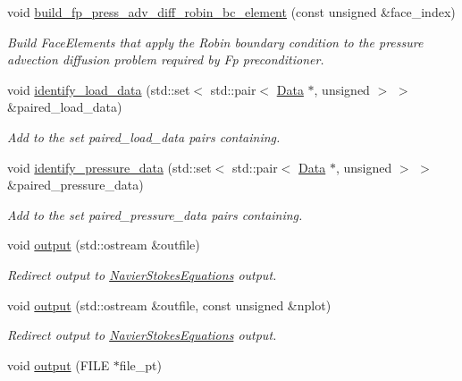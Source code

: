 \begin{DoxyCompactItemize}
void \hyperlink{classoomph_1_1QCrouzeixRaviartElement_a5b824083683ead3f8bead4061bce21f1}{build\+\_\+fp\+\_\+press\+\_\+adv\+\_\+diff\+\_\+robin\+\_\+bc\+\_\+element} (const unsigned \&face\+\_\+index)
\begin{DoxyCompactList}\small\item\em Build Face\+Elements that apply the Robin boundary condition to the pressure advection diffusion problem required by Fp preconditioner. \end{DoxyCompactList}\item 
void \hyperlink{classoomph_1_1QCrouzeixRaviartElement_ae57ed7defb77ccaa537a5d9caae68172}{identify\+\_\+load\+\_\+data} (std\+::set$<$ std\+::pair$<$ \hyperlink{classoomph_1_1Data}{Data} $\ast$, unsigned $>$ $>$ \&paired\+\_\+load\+\_\+data)
\begin{DoxyCompactList}\small\item\em Add to the set {\ttfamily paired\+\_\+load\+\_\+data} pairs containing. \end{DoxyCompactList}\item 
void \hyperlink{classoomph_1_1QCrouzeixRaviartElement_ad01a1d2af20703dfb57971bfba4d376e}{identify\+\_\+pressure\+\_\+data} (std\+::set$<$ std\+::pair$<$ \hyperlink{classoomph_1_1Data}{Data} $\ast$, unsigned $>$ $>$ \&paired\+\_\+pressure\+\_\+data)
\begin{DoxyCompactList}\small\item\em Add to the set {\ttfamily paired\+\_\+pressure\+\_\+data} pairs containing. \end{DoxyCompactList}\item 
void \hyperlink{classoomph_1_1QCrouzeixRaviartElement_a0d152892ee354f495bbaced9e423b541}{output} (std\+::ostream \&outfile)
\begin{DoxyCompactList}\small\item\em Redirect output to \hyperlink{classoomph_1_1NavierStokesEquations}{Navier\+Stokes\+Equations} output. \end{DoxyCompactList}\item 
void \hyperlink{classoomph_1_1QCrouzeixRaviartElement_a79751498caa7ce608e91b766fcb355cb}{output} (std\+::ostream \&outfile, const unsigned \&nplot)
\begin{DoxyCompactList}\small\item\em Redirect output to \hyperlink{classoomph_1_1NavierStokesEquations}{Navier\+Stokes\+Equations} output. \end{DoxyCompactList}\item 
void \hyperlink{classoomph_1_1QCrouzeixRaviartElement_ac6d68815a8cd9885b724d79d133ce00c}{output} (F\+I\+LE $\ast$file\+\_\+pt)

\end{DoxyCompactItemize}
